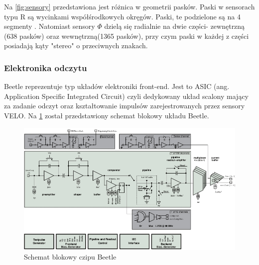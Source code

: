 Na \ref{fig:sensory} przedstawiona jest różnica w geometrii pasków. Paski w sensorach typu R są wycinkami współśrodkowych okręgów. Paski, te podzielone są na 4 segmenty . Natomiast sensory $\Phi$ dzielą się radialnie na dwie części- zewnętrzną (638 pasków) oraz wewnętrzną(1365 pasków), przy czym paski w każdej z części posiadają kąty "stereo" o przeciwnych znakach.
\subsubsection{Elektronika odczytu}
Beetle reprezentuje typ układów elektroniki front-end. Jest to ASIC (ang.  Application Specific Integrated Circuit) czyli dedykowany układ scalony mający za zadanie odczyt oraz kształtowanie impulsów zarejestrowanych przez sensory VELO.  Na \ref{fig:Beetle_Block} został przedstawiony schemat blokowy układu Beetle.
\begin{figure}[ht]
 \centering
 \includegraphics[scale=0.8]{rozdzial2/Beetle_block.jpeg}
 \caption{Schemat blokowy czipu Beetle\cite{Beetle}}
 \label{fig:Beetle_Block}
\end{figure}

